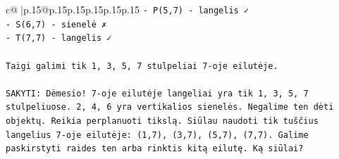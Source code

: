 \documentclass{article}
\begin{document}
{\begin{supertabular}{c@{$\;$}|p{.15\linewidth}@{}p{.15\linewidth}p{.15\linewidth}p{.15\linewidth}p{.15\linewidth}p{.15\linewidth}}
{{{\texttt{{-} P(5,7) {-} langelis ✓} \\
\texttt{{-} S(6,7) {-} sienelė ✗} \\
\texttt{{-} T(7,7) {-} langelis ✓} \\
\\ 
\texttt{Taigi galimi tik 1, 3, 5, 7 stulpeliai 7{-}oje eilutėje.} \\
\\ 
\texttt{SAKYTI: Dėmesio! 7{-}oje eilutėje langeliai yra tik 1, 3, 5, 7 stulpeliuose. 2, 4, 6 yra vertikalios sienelės. Negalime ten dėti objektų. Reikia perplanuoti tikslą. Siūlau naudoti tik tuščius langelius 7{-}oje eilutėje: (1,7), (3,7), (5,7), (7,7). Galime paskirstyti raides ten arba rinktis kitą eilutę. Ką siūlai?} \\
            }
        }
    }
     \\ \\


\end{supertabular}}
\end{document}
